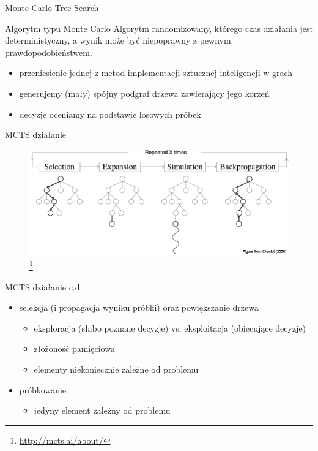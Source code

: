 \begin{frame}{Monte Carlo Tree Search}
  \begin{block}{Algorytm typu Monte Carlo}
    Algorytm randomizowany, którego czas działania jest deterministyczny, a
    wynik może być niepoprawny z pewnym prawdopodobieństwem.
  \end{block}
  \pause
  \begin{itemize}
    \item przeniesienie jednej z metod implementacji sztucznej inteligencji w
      grach
      \pause
    \item generujemy (mały) spójny podgraf drzewa zawierający jego korzeń
      \pause
    \item decyzje oceniamy na podstawie losowych próbek
  \end{itemize}
\end{frame}

\begin{frame}{MCTS działanie}
  \begin{figure}
    \includegraphics[width=\linewidth]{mcts-algorithm-1a.png}
    \footnote{\url{http://mcts.ai/about/}}
  \end{figure}
\end{frame}

\begin{frame}{MCTS działanie c.d.}
  \begin{itemize}
    \item selekcja (i propagacja wyniku próbki) oraz powiększanie drzewa
      \pause
      \begin{itemize}
        \item eksploracja (słabo poznane decyzje) vs. eksploitacja (obiecujące decyzje)
        \item złożoność pamięciowa
        \item elementy niekoniecznie zależne od problemu
      \end{itemize}
      \pause
    \item próbkowanie
      \begin{itemize}
        \item jedyny element zależny od problemu
      \end{itemize}
  \end{itemize}
\end{frame}

